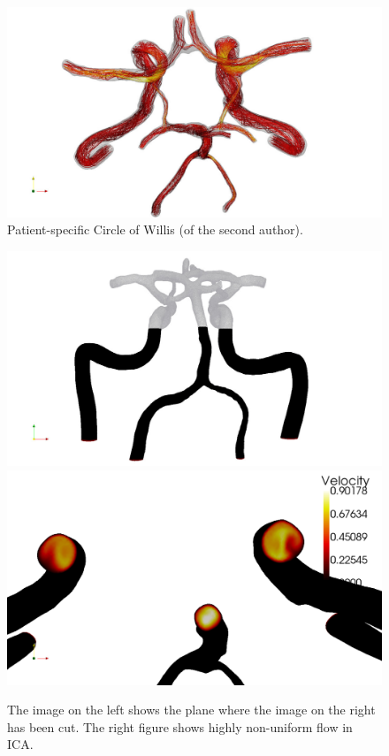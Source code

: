 \begin{figure}
  \center\includegraphics[width=\fullfig]{chapters/kvs-2/pdf/cok_top_steam_white.pdf}
  \caption{Patient-specific Circle of Willis (of the second author).}
  \label{fig:kvs-2:screenshot}
\end{figure}

\begin{figure}
  \begin{center}
    \includegraphics[width=\largefig]{chapters/kvs-2/pdf/cok_slice.pdf} \\
    \includegraphics[width=\largefig]{chapters/kvs-2/pdf/cok_ica_vel_peak_syst.pdf}
  \end{center}
    \caption{The image on the left shows the plane where the image on
      the right has been cut.  The right figure shows highly
      non-uniform flow in ICA.}
    \label{fig:kvs-2:cok_ica}
\end{figure}
